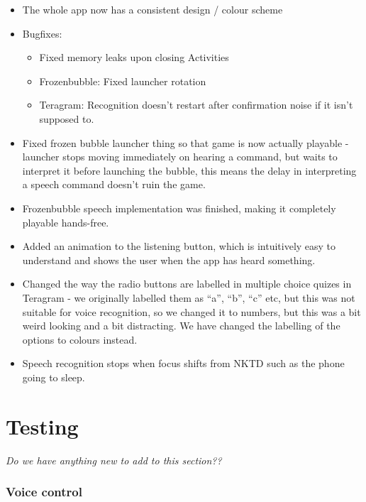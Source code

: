 \documentclass[11pt, oneside]{article}
\begin{document}
\begin{itemize}

\item The whole app now has a consistent design / colour scheme

\item Bugfixes:
\begin{itemize}
	\item Fixed memory leaks upon closing Activities
	\item Frozenbubble: Fixed launcher rotation
	\item Teragram: Recognition doesn't restart after confirmation noise if it isn't supposed to.
\end{itemize}

\item Fixed frozen bubble launcher thing so that game is now actually playable - launcher stops moving immediately on hearing a command, but waits to interpret it before launching the bubble, this means the delay in interpreting a speech command doesn't ruin the game.

\item Frozenbubble speech implementation was finished, making it completely playable hands-free.

\item Added an animation to the listening button, which is intuitively easy to understand and shows the user when the app has heard something.

\item Changed the way the radio buttons are labelled in multiple choice quizes in Teragram - we originally labelled them as ``a'', ``b'', ``c'' etc, but this was not suitable for voice recognition, so we changed it to numbers, but this was a bit weird looking and a bit distracting. We have changed the labelling of the options to colours instead.

\item Speech recognition stops when focus shifts from NKTD such as the phone going to sleep. 
\end{itemize}

\pagebreak

\section{Testing}

{\em Do we have anything new to add to this section??}

\subsubsection*{Voice control}
\end{document}
